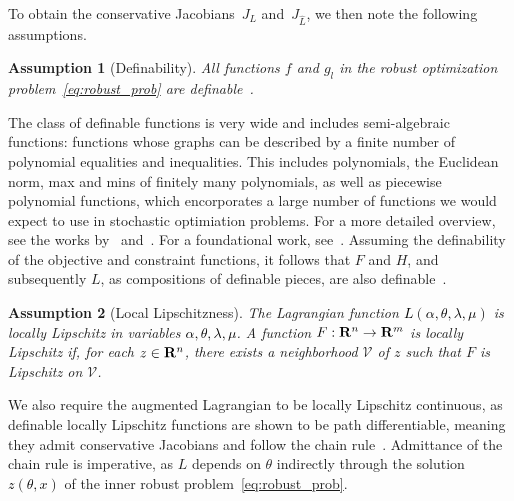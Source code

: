 \documentclass[11pt]{article}
\newtheorem{assumption}{Assumption}
\newtheorem{assumption}{Assumption}[section]
\newcommand{\bsnote}[1]{\noindent\textcolor{red}{\texttt{Bartolomeo: #1}}}
\newcommand{\RC}[1]{\textcolor{black}{#1}}
\begin{document}
To obtain the conservative Jacobians~$J_L$ and~$J_{\hat{L}}$, we then note the following assumptions. 
\begin{assumption} [Definability]
    \label{ass:define}
All functions $f$ and $g_l$ in the robust optimization problem~\eqref{eq:robust_prob} are  {\it definable}~\citep{definable,definable2,path-diff}. 
\end{assumption} 
The class of definable functions is very wide and includes semi-algebraic functions: functions whose graphs can be described by a finite number of polynomial equalities and inequalities. This includes polynomials, the Euclidean norm, max and mins of finitely many polynomials, as well as piecewise polynomial functions, which encorporates a large number of functions we would expect to use in stochastic optimiation problems. For a more detailed overview, see the works by~\cite{conservative} and~\cite{path-diff}. For a foundational work, see~\cite{definable}. 
Assuming the definability of the objective and constraint functions, it follows that $F$ and $H$, and subsequently $L$, as compositions of definable pieces, are also definable~\citep{path-diff}. 
\begin{assumption} [Local Lipschitzness]
    \label{ass:lip}
    The Lagrangian function \RC{$L(\alpha,\theta,\lambda,\mu)$} is locally Lipschitz in variables \RC{$\alpha,\theta, \lambda,\mu$}. A function $F:{\mathbf R}^n \rightarrow {\mathbf R}^m$ is locally Lipschitz if, for each $z \in {\mathbf R}^n$, there exists a neighborhood $\mathcal{V}$ of $z$ such that $F$ is Lipschitz on $\mathcal{V}$.
\end{assumption}
We also require the augmented Lagrangian to be locally Lipschitz continuous, as definable locally Lipschitz functions are shown to be path differentiable, meaning they admit conservative Jacobians and follow the chain rule~\citep{path-diff}.
Admittance of the chain rule is imperative, as 
$L$ depends on $\theta$ indirectly through the solution \RC{$z(\theta,x)$} of the inner robust problem~\eqref{eq:robust_prob}. 
\end{document}
